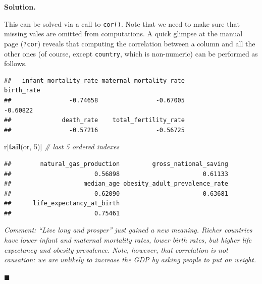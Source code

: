 \documentclass[10pt,b5paper,krantz1]{krantz}
\newenvironment{Shaded}{\begin{snugshade}}{\end{snugshade}}
\newcommand{\CommentTok}[1]{\textcolor[rgb]{0.37,0.37,0.37}{\textit{#1}}}
\newcommand{\DataTypeTok}[1]{\textcolor[rgb]{0.27,0.27,0.27}{#1}}
\newcommand{\DecValTok}[1]{\textcolor[rgb]{0.06,0.06,0.06}{#1}}
\newcommand{\KeywordTok}[1]{\textcolor[rgb]{0.27,0.27,0.27}{\textbf{#1}}}
\newcommand{\NormalTok}[1]{#1}
\newcommand{\OperatorTok}[1]{\textcolor[rgb]{0.43,0.43,0.43}{\textbf{#1}}}
\newcommand{\StringTok}[1]{\textcolor[rgb]{0.5,0.5,0.5}{#1}}
\newenvironment{solution}{%
\bigskip\noindent\textbf{Solution. }%
\it\ignorespaces%
\ignorespaces%
}{\ignorespaces%
\hfill$\blacksquare$%
}
\begin{document}
\begin{solution}

This can be solved via a call to \texttt{cor()}.
Note that we need to make sure that missing vales are omitted
from computations.
A quick glimpse at the manual page
(\texttt{?cor}) reveals that computing the correlation between a column
and all the other ones (of course, except \texttt{country}, which
is non-numeric) can be performed as follows.

\begin{Shaded}
\end{Shaded}

\begin{verbatim}
##   infant_mortality_rate maternal_mortality_rate              birth_rate 
##                -0.74658                -0.67005                -0.60822 
##              death_rate    total_fertility_rate 
##                -0.57216                -0.56725
\end{verbatim}

\begin{Shaded}
\begin{Highlighting}[]
\NormalTok{r[}\KeywordTok{tail}\NormalTok{(or, }\DecValTok{5}\NormalTok{)] }\CommentTok{# last 5 ordered indexes}
\end{Highlighting}
\end{Shaded}

\begin{verbatim}
##        natural_gas_production         gross_national_saving 
##                       0.56898                       0.61133 
##                    median_age obesity_adult_prevalence_rate 
##                       0.62090                       0.63681 
##      life_expectancy_at_birth 
##                       0.75461
\end{verbatim}

\emph{Comment: ``Live long and prosper'' just gained a new meaning.
Richer countries have lower infant and maternal mortality rates,
lower birth rates, but higher life expectancy and obesity prevalence.
Note, however, that correlation is not causation:
we are unlikely to increase the GDP by asking people to put on weight.}

\end{solution}
\end{document}
